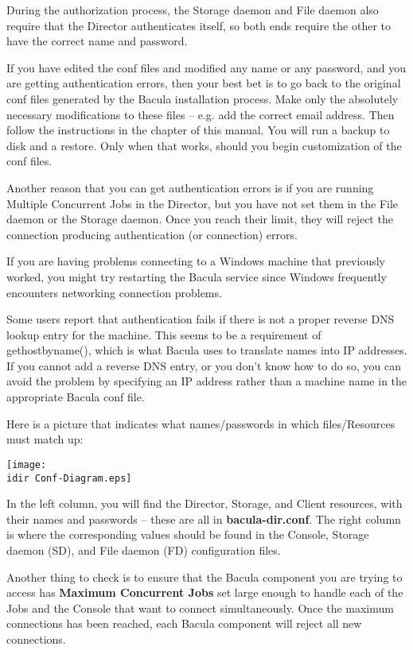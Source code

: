 \begin{description}
   During the authorization process, the Storage daemon and File daemon
   also require that the Director authenticates itself, so both ends
   require the other to have the correct name and password.

   If you have edited the conf files and modified any name or any password,
   and you are getting authentication errors, then your best bet is to go
   back to the original conf files generated by the Bacula installation
   process.  Make only the absolutely necessary modifications to these
   files -- e.g.  add the correct email address.  Then follow the
   instructions in the  chapter of
   this manual.  You will run a backup to disk and a restore.  Only when
   that works, should you begin customization of the conf files.

   Another reason that you can get authentication errors is if you are
   running Multiple Concurrent Jobs in the Director, but you have not set
   them in the File daemon or the Storage daemon.  Once you reach their
   limit, they will reject the connection producing authentication (or
   connection) errors.

   If you are having problems connecting to a Windows machine that
   previously worked, you might try restarting the Bacula service since
   Windows frequently encounters networking connection problems.

   Some users report that authentication fails if there is not a proper
   reverse DNS lookup entry for the machine.  This seems to be a
   requirement of gethostbyname(), which is what Bacula uses to translate
   names into IP addresses.  If you cannot add a reverse DNS entry, or you
   don't know how to do so, you can avoid the problem by specifying an IP
   address rather than a machine name in the appropriate Bacula conf file.

   Here is a picture that indicates what names/passwords in which
   files/Resources must match up:

   \texttt{[image: \\idir Conf-Diagram.eps]}  

   In the left column, you will find the Director, Storage, and  Client
   resources, with their names and passwords -- these  are all in {\bf
   bacula-dir.conf}. The right column is where the corresponding values
   should be found in the  Console, Storage daemon (SD), and File daemon (FD)
   configuration  files.  

   Another thing to check is to ensure that the Bacula component you are
   trying to access has {\bf Maximum Concurrent Jobs} set large enough to
   handle each of the Jobs and the Console that want to connect
   simultaneously.  Once the maximum connections has been reached, each
   Bacula component will reject all new connections.


\end{description}
